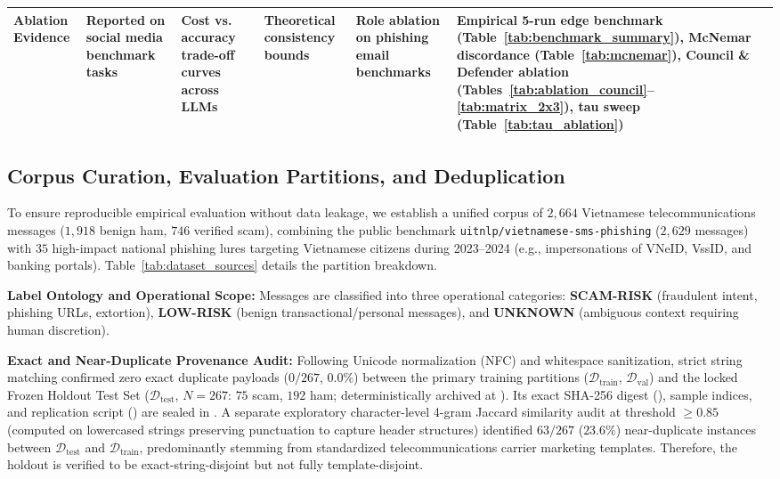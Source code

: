 \documentclass[journal]{IEEEtran}
\begin{document}
\begin{table}[t]
{\begin{tabular}{p{2.6cm}p{2.6cm}p{2.6cm}p{2.6cm}p{2.8cm}p{3.4cm}}
\textbf{Ablation Evidence} & Reported on social media benchmark tasks & Cost vs. accuracy trade-off curves across LLMs & Theoretical consistency bounds & Role ablation on phishing email benchmarks & Empirical 5-run edge benchmark (Table~\ref{tab:benchmark_summary}), McNemar discordance (Table~\ref{tab:mcnemar}), Council \& Defender ablation (Tables~\ref{tab:ablation_council}--\ref{tab:matrix_2x3}), tau sweep (Table~\ref{tab:tau_ablation}) \\
\bottomrule
\end{tabular}%
}
\end{table}

\subsection{Corpus Curation, Evaluation Partitions, and Deduplication}
\label{subsec:dataset}

To ensure reproducible empirical evaluation without data leakage, we establish a unified corpus of $2,664$ Vietnamese telecommunications messages ($1,918$ benign ham, $746$ verified scam), combining the public benchmark \texttt{uitnlp/vietnamese-sms-phishing} ($2,629$ messages) with $35$ high-impact national phishing lures targeting Vietnamese citizens during 2023--2024 (e.g., impersonations of VNeID, VssID, and banking portals). Table~\ref{tab:dataset_sources} details the partition breakdown.

\textbf{Label Ontology and Operational Scope:} Messages are classified into three operational categories: \textbf{SCAM-RISK} (fraudulent intent, phishing URLs, extortion), \textbf{LOW-RISK} (benign transactional/personal messages), and \textbf{UNKNOWN} (ambiguous context requiring human discretion).

\textbf{Exact and Near-Duplicate Provenance Audit:} Following Unicode normalization (NFC) and whitespace sanitization, strict string matching confirmed zero exact duplicate payloads ($0/267$, $0.0\%$) between the primary training partitions ($\mathcal{D}_{\text{train}}$, $\mathcal{D}_{\text{val}}$) and the locked Frozen Holdout Test Set ($\mathcal{D}_{\text{test}}$, $N=267$: $75$ scam, $192$ ham; deterministically archived at ). Its exact SHA-256 digest (), sample indices, and replication script () are sealed in . A separate exploratory character-level 4-gram Jaccard similarity audit at threshold $\ge 0.85$ (computed on lowercased strings preserving punctuation to capture header structures) identified $63 / 267$ ($23.6\%$) near-duplicate instances between $\mathcal{D}_{\text{test}}$ and $\mathcal{D}_{\text{train}}$, predominantly stemming from standardized telecommunications carrier marketing templates. Therefore, the holdout is verified to be exact-string-disjoint but not fully template-disjoint. 
\end{document}

